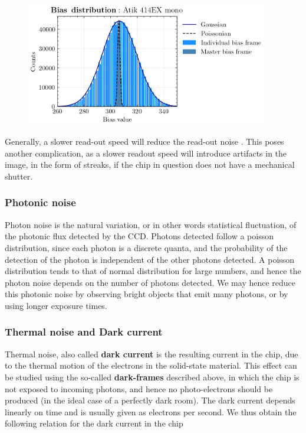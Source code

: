 \documentclass[../main.tex]{subfiles}
\begin{document}
	\begin{figure}[h!]
		\centering
		\includegraphics[width	=0.95\textwidth]{gauss_bias.png}
		\caption{}
		\label{fig:rongauss}
	\end{figure}
	
	Generally, a slower read-out speed will reduce the read-out noise \cite{handbookofccdastronomy}. This poses another complication, as a slower readout speed will introduce artifacts in the image, in the form of streaks, if the chip in question does not have a mechanical shutter.  
	
	\subsubsection{Photonic noise}
	Photon noise is the natural variation, or in other words statistical fluctuation, of the photonic flux detected by the CCD. Photons detected follow a poisson distribution, since each photon is a discrete quanta, and the probability of the detection of the photon is independent of the other photons detected. A poisson distribution tends to that of normal distribution for large numbers, and hence the photon noise depends on the number of photons detected. We may hence reduce this photonic noise by observing bright objects that emit many photons, or by using longer exposure times.
	
	\subsubsection{Thermal noise and Dark current}
	Thermal noise, also called \textbf{dark current} is the resulting current in the chip, due to the thermal motion of the electrons in the solid-state material. This effect can be studied using the so-called \textbf{dark-frames} described above, in which the chip is not exposed to incoming photons, and hence no photo-electrons should be produced (in the ideal case of a perfectly dark room). The dark current depends linearly on time and is usually given as electrons per second. We thus obtain the following relation for the dark current in the chip
	
\end{document}
